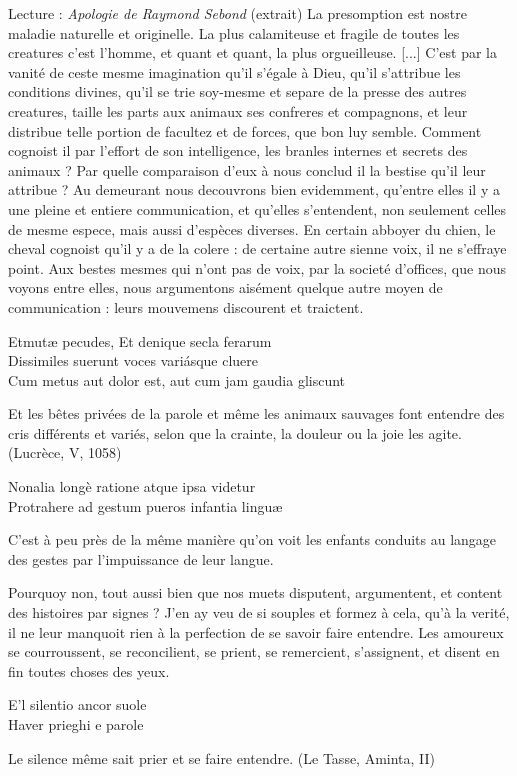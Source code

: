 \begin{lecture}{Lecture : \textit{Apologie de Raymond Sebond} (extrait)}
La presomption est nostre maladie naturelle et originelle. La plus calamiteuse et fragile de toutes les creatures c’est l’homme, et quant et quant, la plus orgueilleuse. [...] C’est par la vanité de ceste mesme imagination qu’il s’égale à Dieu, qu’il s’attribue les conditions divines, qu’il se trie soy-mesme et separe de la presse des autres creatures, taille les parts aux animaux ses confreres et compagnons, et leur distribue telle portion de facultez et de forces, que bon luy semble. Comment cognoist il par l’effort de son intelligence, les branles internes et secrets des animaux ? Par quelle comparaison d’eux à nous conclud il la bestise qu’il leur attribue ? Au demeurant nous decouvrons bien evidemment, qu’entre elles il y a une pleine et entiere communication, et qu’elles s’entendent, non seulement celles de mesme espece, mais aussi d’espèces diverses. En certain abboyer du chien, le cheval cognoist qu’il y a de la colere : de certaine autre sienne voix, il ne s’effraye point. Aux bestes mesmes qui n’ont pas de voix, par la societé d’offices, que nous voyons entre elles, nous argumentons aisément quelque autre moyen de communication : leurs mouvemens discourent et traictent.
\begin{center}
Etmutæ pecudes, Et denique secla ferarum\\
Dissimiles suerunt voces variásque cluere\\
Cum metus aut dolor est, aut cum jam gaudia gliscunt
\end{center}
Et les bêtes privées de la parole et même les animaux sauvages font entendre des cris différents et variés, selon que la crainte, la douleur ou la joie les agite. (Lucrèce, V, 1058)
\begin{center}
Nonalia longè ratione atque ipsa videtur\\
Protrahere ad gestum pueros infantia linguæ
\end{center}
C’est à peu près de la même manière qu’on voit les enfants conduits au langage des gestes par l’impuissance de leur langue.

Pourquoy non, tout aussi bien que nos muets disputent, argumentent, et content des histoires par signes ? J’en ay veu de si souples et formez à cela, qu’à la verité, il ne leur manquoit rien à la perfection de se savoir faire entendre. Les amoureux se courroussent, se reconcilient, se prient, se remercient, s’assignent, et disent en fin toutes choses des yeux.
\begin{center}
E’l silentio ancor suole\\
Haver prieghi e parole
\end{center}
Le silence même sait prier et se faire entendre. (Le Tasse, Aminta, II)


\end{lecture}

